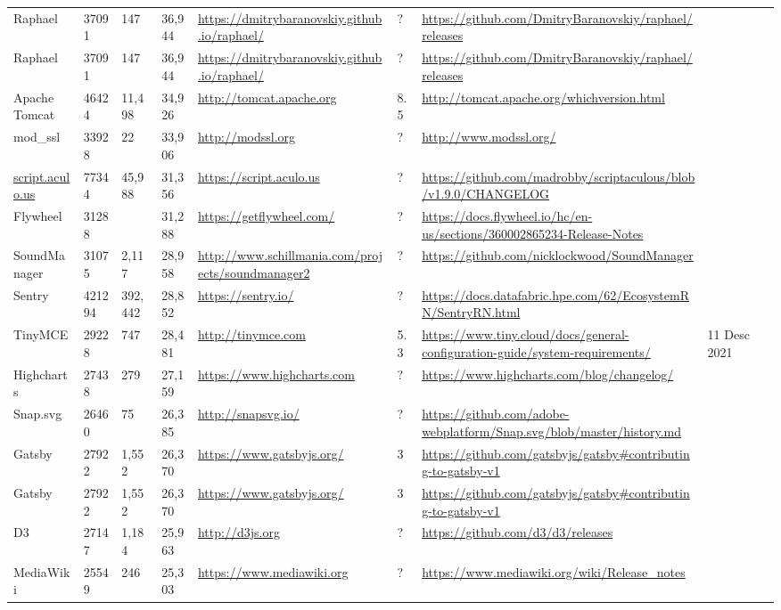 \begin{table}[!htp]
\begin{tabular}{|l|l|l|l|l|l|l|l|l|}
				Raphael &37091 &147 &36,944 &\ul{https://dmitrybaranovskiy.github.io/raphael/} &? &\ul{https://github.com/DmitryBaranovskiy/raphael/releases} & \\
				Raphael &37091 &147 &36,944 &\ul{https://dmitrybaranovskiy.github.io/raphael/} &? &\ul{https://github.com/DmitryBaranovskiy/raphael/releases} & \\
				Apache Tomcat &46424 &11,498 &34,926 &\ul{http://tomcat.apache.org} &8.5 &\ul{http://tomcat.apache.org/whichversion.html} & \\
				mod\_ssl &33928 &22 &33,906 &\ul{http://modssl.org} &? &\ul{http://www.modssl.org/} & \\
				\ul{script.aculo.us} &77344 &45,988 &31,356 &\ul{https://script.aculo.us} &? &\ul{https://github.com/madrobby/scriptaculous/blob/v1.9.0/CHANGELOG} & \\
				Flywheel &31288 & &31,288 &\ul{https://getflywheel.com/} &? &\ul{https://docs.flywheel.io/hc/en-us/sections/360002865234-Release-Notes} & \\
				SoundManager &31075 &2,117 &28,958 &\ul{http://www.schillmania.com/projects/soundmanager2} &? &\ul{https://github.com/nicklockwood/SoundManager} & \\
				Sentry &421294 &392,442 &28,852 &\ul{https://sentry.io/} &? &\ul{https://docs.datafabric.hpe.com/62/EcosystemRN/SentryRN.html} & \\
				TinyMCE &29228 &747 &28,481 &\ul{http://tinymce.com} &5.3 &\ul{https://www.tiny.cloud/docs/general-configuration-guide/system-requirements/} &11 Desc 2021 \\
				Highcharts &27438 &279 &27,159 &\ul{https://www.highcharts.com} &? &\ul{https://www.highcharts.com/blog/changelog/} & \\
				Snap.svg &26460 &75 &26,385 &\ul{http://snapsvg.io/} &? &\ul{https://github.com/adobe-webplatform/Snap.svg/blob/master/history.md} & \\
				Gatsby &27922 &1,552 &26,370 &\ul{https://www.gatsbyjs.org/} &3 &\ul{https://github.com/gatsbyjs/gatsby\#contributing-to-gatsby-v1} & \\
				Gatsby &27922 &1,552 &26,370 &\ul{https://www.gatsbyjs.org/} &3 &\ul{https://github.com/gatsbyjs/gatsby\#contributing-to-gatsby-v1} & \\
				D3 &27147 &1,184 &25,963 &\ul{http://d3js.org} &? &\ul{https://github.com/d3/d3/releases} & \\
				MediaWiki &25549 &246 &25,303 &\ul{https://www.mediawiki.org} &? &\ul{https://www.mediawiki.org/wiki/Release\_notes} & \\

\end{tabular}
\end{table}
